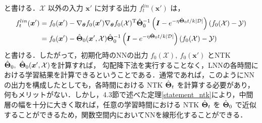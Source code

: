 と書ける．$\mathcal{X}$ 以外の入力 $\bm{x}'$ に対する出力 $f_t^{lin}(\bm{x}')$ は，
\begin{align}
    f_t^{lin}(\bm{x}') &= f_0(\bm{x}') - \nabla_{\bm{\theta}}f_0(\bm{x}')\nabla_{\bm{\theta}}f_0(\mathcal{X})^{\mathrm{T}}\hat{\bm{\Theta}}_{0}^{-1}\left(\bm{I} - e^{-\eta\hat{\bm{\Theta}}_0 t/k|\mathcal{D}|}\right)(f_0(\mathcal{X})- \mathcal{Y}) \\
    &= f_0(\bm{x}') - \hat{\bm{\Theta}}_0(\bm{x}', \mathcal{X}) \hat{\bm{\Theta}}_0^{-1}\left(\bm{I} - e^{-\eta\hat{\bm{\Theta}}_0 t/k|\mathcal{D}|}\right)(f_0(\mathcal{X})- \mathcal{Y})
\end{align}
と書ける．したがって，初期化時のNNの出力 $f_0(\mathcal{X}), \ f_0(\bm{x}')$ とNTK $\hat{\NTK}_0, \ \hat{\NTK}_0(\bm{x}',\mathcal{X})$を計算すれば， 勾配降下法を実行することなく，LNNの各時間における学習結果を計算できるということである．通常であれば，このようにNNの出力を構成したとしても，各時間における NTK $\hat{\bm{\Theta}}_t$ を計算する必要があり，何もメリットがない．しかし，4.3節で述べた定理\ref{statement_ntk}により，中間層の幅を十分に大きく取れば，任意の学習時間における NTK $\hat{\bm{\Theta}}_t$ を $\hat{\bm{\Theta}}_0$ で近似することができるため，関数空間内においてNNを線形化することができる．